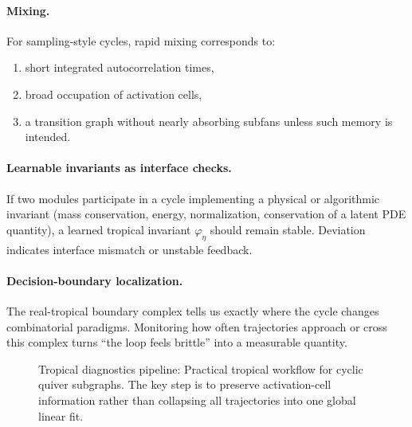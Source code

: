 \documentclass[11pt]{article}
\theoremstyle{definition}
\theoremstyle{plain}
\theoremstyle{remark}
\begin{document}
\paragraph{Mixing.}
For sampling-style cycles, rapid mixing corresponds to:
\begin{enumerate}[leftmargin=2em]
\item short integrated autocorrelation times,
\item broad occupation of activation cells,
\item a transition graph without nearly absorbing subfans unless such memory is intended.
\end{enumerate}

\paragraph{Learnable invariants as interface checks.}
If two modules participate in a cycle implementing a physical or algorithmic invariant (mass conservation, energy, normalization, conservation of a latent PDE quantity), a learned tropical invariant $\varphi_\eta$ should remain stable.
Deviation indicates interface mismatch or unstable feedback.

\paragraph{Decision-boundary localization.}
The real-tropical boundary complex tells us exactly where the cycle changes combinatorial paradigms.
Monitoring how often trajectories approach or cross this complex turns ``the loop feels brittle'' into a measurable quantity.


\begin{figure}[t]
\centering
{}
\caption{Tropical diagnostics pipeline: Practical tropical workflow for cyclic quiver subgraphs. The key step is to preserve activation-cell information rather than collapsing all trajectories into one global linear fit.}
\label{fig:tropical-pipeline}
\end{figure}
\end{document}
